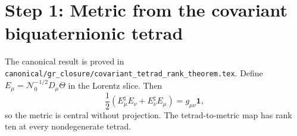 
\ifdefined\INCLUDEMODE
\section{Step 1: Metric from the covariant biquaternionic tetrad}
The canonical result is proved in
\texttt{canonical/gr\_closure/covariant\_tetrad\_rank\_theorem.tex}.
Define $E_\mu=\mathcal N_0^{-1/2}D_\mu\Theta$ in the Lorentz slice.  Then
\[
 \frac12(E_\mu^\sharp E_\nu+E_\nu^\sharp E_\mu)
 =g_{\mu\nu}\mathbf1,
\]
so the metric is central without projection.  The tetrad-to-metric map has rank
ten at every nondegenerate tetrad.
\else

\fi
